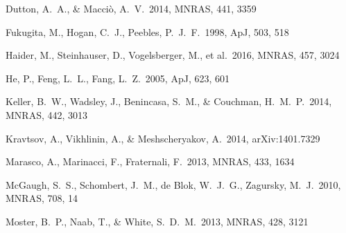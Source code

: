 \documentclass[useAMS,usenatbib]{mn2e}
\def \apj {ApJ}
\def \mnras {MNRAS}
\begin{document}
\begin{thebibliography}{}
 Dutton,
  A.~A., \& Macci{\`o}, A.~V.\ 2014, \mnras, 441, 3359 



    

 Fukugita, M., Hogan, C.~J., Peebles, P.~J.~F.\ 1998, \apj, 503, 518






Haider, M., Steinhauser, D., Vogelsberger, M., et al.\ 2016, \mnras, 457, 3024

He, P., Feng, L.~L., Fang, L.~Z.\ 2005, \apj, 623, 601




 Keller, B.~W., Wadsley, 
  J., Benincasa, S.~M., \& Couchman, H.~M.~P.\ 2014, \mnras, 442, 3013

 Kravtsov, A., 
Vikhlinin, A., \& Meshscheryakov, A.\ 2014, arXiv:1401.7329 

  



Marasco, A., Marinacci, F., Fraternali, F.\ 2013, \mnras, 433, 1634

 McGaugh, S.~S., 
Schombert, J.~M., de Blok, W.~J.~G., Zagursky, M.~J.\ 2010, \mnras,
708, 14

 Moster, B.~P., Naab, T., 
\& White, S.~D.~M.\ 2013, \mnras, 428, 3121 










\end{thebibliography}
\end{document}
